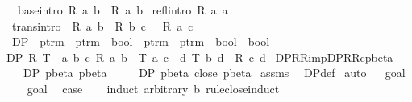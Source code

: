 \begin{isabellebody}
\isanewline
\ \ base{\isacharbrackleft}intro{\isacharbrackright}{\isacharcolon}\ {\isachardoublequoteopen}R\ a\ b\ {\isasymLongrightarrow}\ R{\isacharasterisk}\ a\ b{\isachardoublequoteclose}\isanewline
{\isacharbar}\ refl{\isacharbrackleft}intro{\isacharbrackright}{\isacharcolon}\ {\isachardoublequoteopen}R{\isacharasterisk}\ a\ a{\isachardoublequoteclose}\isanewline
{\isacharbar}\ trans{\isacharbrackleft}intro{\isacharbrackright}{\isacharcolon}\ {\isachardoublequoteopen}{\isasymlbrakk}\ R{\isacharasterisk}\ a\ b\ {\isacharsemicolon}\ R{\isacharasterisk}\ b\ c\ {\isasymrbrakk}\ {\isasymLongrightarrow}\ R{\isacharasterisk}\ a\ c{\isachardoublequoteclose}%
\isamarkuptrue%
\isamarkupfalse%
\ DP\ {\isacharcolon}{\isacharcolon}\ {\isachardoublequoteopen}{\isacharparenleft}ptrm\ {\isasymRightarrow}\ ptrm\ {\isasymRightarrow}\ bool{\isacharparenright}\ {\isasymRightarrow}\ {\isacharparenleft}ptrm\ {\isasymRightarrow}\ ptrm\ {\isasymRightarrow}\ bool{\isacharparenright}\ {\isasymRightarrow}\ bool{\isachardoublequoteclose}\ \isanewline
{\isachardoublequoteopen}DP\ R\ T\ {\isacharequal}\ {\isacharparenleft}{\isasymforall}a\ b\ c{\isachardot}\ R\ a\ b\ {\isasymand}\ T\ a\ c\ {\isasymlongrightarrow}\ {\isacharparenleft}{\isasymexists}d{\isachardot}\ T\ b\ d\ {\isasymand}\ R\ c\ d{\isacharparenright}{\isacharparenright}{\isachardoublequoteclose}\isanewline
\isanewline
{}\isamarkupfalse%
\ DP{\isacharunderscore}R{\isacharunderscore}R{\isacharunderscore}imp{\isacharunderscore}DP{\isacharunderscore}R{\isacharunderscore}Rc{\isacharunderscore}pbeta{\isacharcolon}\isanewline
\ \ \ {\isachardoublequoteopen}DP\ pbeta\ pbeta{\isachardoublequoteclose}\isanewline
\ \ \ \ \ {\isachardoublequoteopen}DP\ pbeta\ {\isacharparenleft}close\ pbeta{\isacharparenright}{\isachardoublequoteclose}\isanewline
%
\isadelimproof
%
\endisadelimproof
%
\isatagproof
{}\isamarkupfalse%
\ assms\ \isamarkupfalse%
\ DP{\isacharunderscore}def\isanewline
{}\isamarkupfalse%
\ auto\isanewline
{}\isamarkupfalse%
\ {\isacharminus}\isanewline
{}\isamarkupfalse%
\ goal{}\ \isanewline
\ \ \isamarkupfalse%
\ goal{}{\isacharparenleft}{}{\isacharcomma}{}{\isacharparenright}\ \isamarkupfalse%
\ {\isacharquery}case\isanewline
\ \ \isamarkupfalse%
\ {\isacharparenleft}induct\ arbitrary{\isacharcolon}\ b\ rule{\isacharcolon}close{\isachardot}induct{\isacharparenright}\isanewline

\end{isabellebody}
